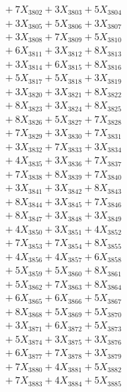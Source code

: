 \documentclass[a4paper,10pt]{article}
\begin{document}
{\begin{align}
&\;  + 7 X_{3802} + 3 X_{3803} + 5 X_{3804} \\[0.3ex]
&\;  + 3 X_{3805} + 5 X_{3806} + 3 X_{3807} \\[0.3ex]
&\;  + 3 X_{3808} + 7 X_{3809} + 5 X_{3810} \\[0.3ex]
&\;  + 6 X_{3811} + 3 X_{3812} + 8 X_{3813} \\[0.3ex]
&\;  + 3 X_{3814} + 6 X_{3815} + 8 X_{3816} \\[0.3ex]
&\;  + 5 X_{3817} + 5 X_{3818} + 3 X_{3819} \\[0.5ex]\allowbreak
&\;  + 3 X_{3820} + 3 X_{3821} + 8 X_{3822} \\[0.3ex]
&\;  + 8 X_{3823} + 3 X_{3824} + 8 X_{3825} \\[0.3ex]
&\;  + 8 X_{3826} + 5 X_{3827} + 7 X_{3828} \\[0.3ex]
&\;  + 7 X_{3829} + 3 X_{3830} + 7 X_{3831} \\[0.3ex]
&\;  + 3 X_{3832} + 7 X_{3833} + 3 X_{3834} \\[0.3ex]
&\;  + 4 X_{3835} + 3 X_{3836} + 7 X_{3837} \\[0.3ex]
&\;  + 7 X_{3838} + 8 X_{3839} + 7 X_{3840} \\[0.3ex]
&\;  + 3 X_{3841} + 3 X_{3842} + 8 X_{3843} \\[0.3ex]
&\;  + 8 X_{3844} + 3 X_{3845} + 7 X_{3846} \\[0.3ex]
&\;  + 8 X_{3847} + 3 X_{3848} + 3 X_{3849} \\[0.5ex]\allowbreak
&\;  + 4 X_{3850} + 3 X_{3851} + 4 X_{3852} \\[0.3ex]
&\;  + 7 X_{3853} + 7 X_{3854} + 8 X_{3855} \\[0.3ex]
&\;  + 4 X_{3856} + 4 X_{3857} + 6 X_{3858} \\[0.3ex]
&\;  + 5 X_{3859} + 5 X_{3860} + 8 X_{3861} \\[0.3ex]
&\;  + 5 X_{3862} + 7 X_{3863} + 8 X_{3864} \\[0.3ex]
&\;  + 6 X_{3865} + 6 X_{3866} + 5 X_{3867} \\[0.3ex]
&\;  + 8 X_{3868} + 5 X_{3869} + 5 X_{3870} \\[0.3ex]
&\;  + 3 X_{3871} + 6 X_{3872} + 5 X_{3873} \\[0.3ex]
&\;  + 5 X_{3874} + 3 X_{3875} + 3 X_{3876} \\[0.3ex]
&\;  + 6 X_{3877} + 7 X_{3878} + 3 X_{3879} \\[0.5ex]\allowbreak
&\;  + 7 X_{3880} + 4 X_{3881} + 5 X_{3882} \\[0.3ex]
&\;  + 7 X_{3883} + 4 X_{3884} + 5 X_{3885} \\[0.3ex]

\end{align}}
\end{document}
